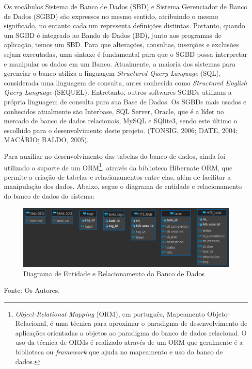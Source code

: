 \documentclass[a4paper,12pt]{article}
\begin{document}
Os vocábulos Sistema de Banco de Dados (SBD) e Sistema Gerenciador de Banco de Dados (SGBD) são expressos no mesmo sentido, atribuindo o mesmo 
significado, no entanto cada um representa definições distintas. Portanto, quando um SGBD é integrado ao Bando de Dados (BD), junto aos 
programas de aplicação, temos um SBD. Para que alterações, consultas, inserções e exclusões sejam executadas, uma sintaxe é fundamental 
para que o SGBD possa interpretar e manipular os dados em um Banco. Atualmente, a maioria dos sistemas para gerenciar o banco utiliza a 
linguagem \textit{Structured Query Language} (SQL), considerada uma linguagem de consulta, antes conhecida 
como \textit{Structured English Query Language} (SEQUEL). Entretanto, outros softwares SGBDs utilizam a própria linguagem de 
consulta para sua Base de Dados. Os SGBDs mais usados e 
conhecidos atualmente são Interbase, SQL Server, Oracle, que é a líder no mercado de banco de dados relacionais, 
MySQL e SQlite3, sendo este último o escolhido para o desenvolvimento deste projeto. (TONSIG, 2006; DATE, 2004; MACÁRIO; BALDO, 2005). 

Para auxiliar no desenvolvimento das tabelas do banco de dados, ainda foi utilizado o suporte de um ORM\footnote{
	\textit{Object-Relational Mapping} (ORM), em português, Mapeamento Objeto-Relacional, é uma técnica para aproximar o paradigma de desenvolvimento 
	de aplicações orientadas a objetos ao paradigma do banco de dados relacional. O uso da técnica de ORMs é 
	realizado através de um ORM que geralmente é a biblioteca ou \textit{framework} que ajuda no mapeamento e uso do banco de dados.
}, através da biblioteca Hibernate ORM, que permite a criação de tabelas e relacionamentos entre elas, além de facilitar a manipulação dos dados. Abaixo, segue o diagrama de entidade e relacionamento do banco de dados do sistema:
\begin{figure}[H]
	\centering
	\includegraphics[scale=0.80]{database/database-diagram.png}
	\caption{Diagrama de Entidade e Relacionamento do Banco de Dados}
\end{figure}
\noindent Fonte: Os Autores.

\end{document}
